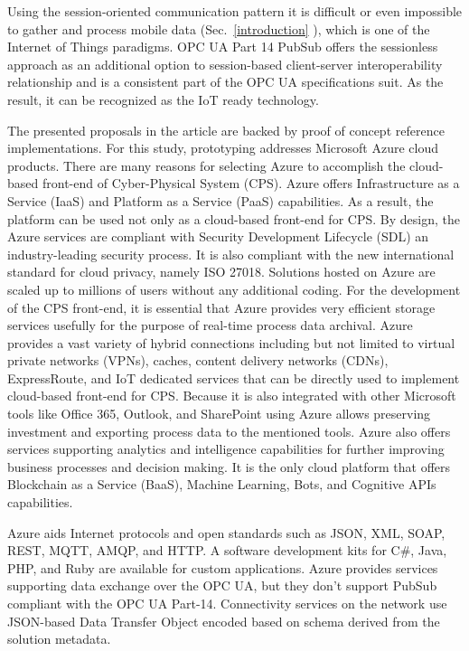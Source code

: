 \documentclass{article}
\begin{document}
Using the session-oriented communication pattern it is difficult or even impossible to gather and process mobile data (Sec.~\ref{introduction} ), which is one of the Internet of Things paradigms. OPC UA Part 14 PubSub \cite{RefWorks:doc:5d98837de4b055984c0eecf0, UAPart14PubSubMainTechnologyFeatures} offers the sessionless approach as an additional option to session-based client-server interoperability relationship and is a consistent part of the OPC UA specifications suit. As the result, it can be recognized as the IoT ready technology.

The presented proposals in the article are backed by proof of concept reference implementations\cite{mariusz_postol_2020_4361640}. For this study, prototyping addresses Microsoft Azure cloud products. There are many reasons for selecting Azure to accomplish the cloud-based front-end of Cyber-Physical System (CPS). Azure offers Infrastructure as a Service (IaaS) and Platform as a Service (PaaS) capabilities. As a result, the platform can be used not only as a cloud-based front-end for CPS. By design, the Azure services are compliant with Security Development Lifecycle (SDL) an industry-leading security process. It is also compliant with the new international standard for cloud privacy, namely ISO 27018. Solutions hosted on Azure are scaled up to millions of users without any additional coding. For the development of the CPS front-end, it is essential that Azure provides very efficient storage services usefully for the purpose of real-time process data archival. Azure provides a vast variety of hybrid connections including but not limited to virtual private networks (VPNs), caches, content delivery networks (CDNs), ExpressRoute, and IoT dedicated services that can be directly used to implement cloud-based front-end for CPS. Because it is also integrated with other Microsoft tools like Office 365, Outlook, and SharePoint using Azure allows preserving investment and exporting process data to the mentioned tools. Azure also offers services supporting analytics and intelligence capabilities for further improving business processes and decision making. It is the only cloud platform that offers Blockchain as a Service (BaaS), Machine Learning, Bots, and Cognitive APIs capabilities.

Azure aids Internet protocols and open standards such as JSON, XML, SOAP, REST, MQTT\cite{RefWorks:doc:5d91e158e4b02eb43d36bb97}, AMQP\cite{RefWorks:doc:5d91d2d9e4b0bc72a68ffe06}, and HTTP. A software development kits for C\#, Java, PHP, and Ruby are available for custom applications. Azure provides services supporting data exchange over the OPC UA, but they don't support PubSub compliant with the OPC UA Part-14. Connectivity services on the network use JSON-based Data Transfer Object encoded based on schema derived from the solution metadata.
\end{document}
